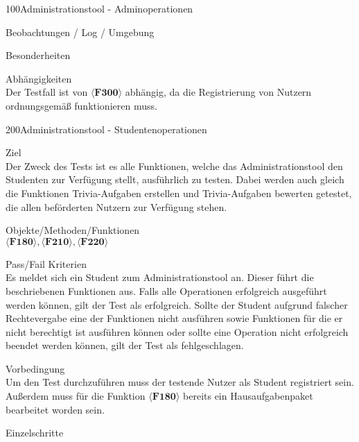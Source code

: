 \begin{testcase}{100}{Administrationstool - Adminoperationen}
\item[Beobachtungen / Log / Umgebung]~\\


\item[Besonderheiten]~\\

\item[Abhängigkeiten]~\\
Der Testfall ist von $\langle\textbf{F300}\rangle$ abhängig, da die Registrierung von Nutzern ordnungsgemäß funktionieren muss.

\end{testcase}

\begin{testcase}{200}{Administrationstool - Studentenoperationen}

\item[Ziel]~\\
Der Zweck des Tests ist es alle Funktionen, welche das Administrationstool den Studenten zur Verfügung stellt, ausführlich zu testen. Dabei werden auch gleich die Funktionen Trivia-Aufgaben erstellen und Trivia-Aufgaben bewerten getestet, die allen beförderten Nutzern zur Verfügung stehen.

\item[Objekte/Methoden/Funktionen]~\\
$\langle\textbf{F180}\rangle, \langle\textbf{F210}\rangle, \langle\textbf{F220}\rangle$ 

\item[Pass/Fail Kriterien]~\\
Es meldet sich ein Student zum Administrationstool an. Dieser führt die beschriebenen Funktionen aus. Falls alle Operationen erfolgreich ausgeführt werden können, gilt der Test als erfolgreich. Sollte der Student aufgrund falscher Rechtevergabe eine der Funktionen nicht ausführen sowie Funktionen für die er nicht berechtigt ist ausführen können oder sollte eine Operation nicht erfolgreich beendet werden können, gilt der Test als fehlgeschlagen.

\item[Vorbedingung]~\\
Um den Test durchzuführen muss der testende Nutzer als Student registriert sein. Außerdem muss für die Funktion $\langle\textbf{F180}\rangle$ bereits ein Hausaufgabenpaket bearbeitet worden sein.

\item[Einzelschritte]~\\


\end{testcase}
